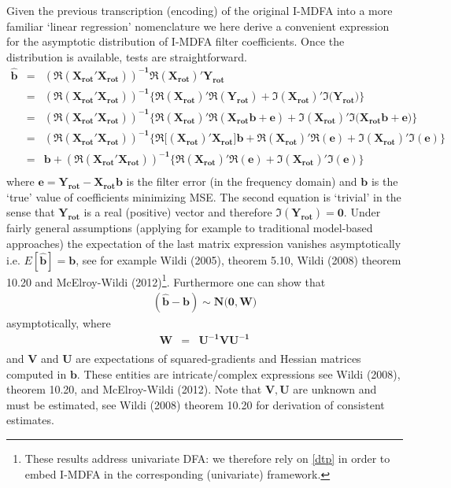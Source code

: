 \documentclass[11pt]{article}
\begin{document}
Given the previous transcription (encoding) of the original I-MDFA into a more familiar `linear regression' nomenclature we here derive a convenient expression for the asymptotic distribution of I-MDFA filter coefficients. Once the distribution is available, tests are straightforward.
\begin{eqnarray*}
\mathbf{\hat{b}}&=&\mathbf{\left(\Re\left(X_{\textrm{rot}}'X_{\textrm{rot}}\right)\right)^{-1}\Re(X_{\textrm{rot}})'Y_{\textrm{rot}}}\\
&=&\mathbf{\left(\Re\left(X_{\textrm{rot}}'X_{\textrm{rot}}\right)\right)^{-1}\Big\{\Re(X_{\textrm{rot}})'\Re(Y_{\textrm{rot}})+\Im(X_{\textrm{rot}})'\Im(Y_{\textrm{rot}}})\Big\}\\
&=&\mathbf{\left(\Re\left(X_{\textrm{rot}}'X_{\textrm{rot}}\right)\right)^{-1}\Big\{\Re(X_{\textrm{rot}})'\Re(X_{\textrm{rot}}b+e)+\Im(X_{\textrm{rot}})'\Im(X_{\textrm{rot}}b+e})\Big\}\\
&=&\mathbf{\left(\Re\left(X_{\textrm{rot}}'X_{\textrm{rot}}\right)\right)^{-1}\Big\{\Re\Big[(X_{\textrm{rot}})'X_{\textrm{rot}}\Big]b+\Re(X_{\textrm{rot}})'\Re(e)+\Im(X_{\textrm{rot}})'\Im(e)}\Big\}\\
&=&\mathbf{b+\left(\Re\left(X_{\textrm{rot}}'X_{\textrm{rot}}\right)\right)^{-1}\Big\{\Re(X_{\textrm{rot}})'\Re(e)+\Im(X_{\textrm{rot}})'\Im(e)}\Big\}\\
\end{eqnarray*}
where $\mathbf{e}=\mathbf{Y_{\textrm{rot}}-X_{\textrm{rot}}b}$ is the filter error (in the frequency domain) and $\mathbf{b}$ is the `true' value of coefficients minimizing MSE. The second equation is `trivial' in the sense that $\mathbf{Y_{\textrm{rot}}}$ is a real (positive) vector and therefore $\mathbf{\Im(Y_{\textrm{rot}})=0}$.
Under fairly general assumptions (applying for example to traditional model-based approaches) the expectation of the last matrix expression vanishes asymptotically i.e. $E[\mathbf{\hat{b}}]=\mathbf{b}$, see for example Wildi (2005), theorem 5.10, Wildi (2008) theorem 10.20 and McElroy-Wildi (2012)\footnote{These 
results address univariate DFA: we therefore rely on \ref{dtp} in order to embed I-MDFA in the corresponding (univariate) framework.}. Furthermore one can show that 
\begin{eqnarray}\label{distria}
\mathbf{(\hat{b}-b)}\sim\mathbf{N(0,{W}})
\end{eqnarray}
asymptotically, where
\begin{eqnarray*}
\mathbf{W}&=&\mathbf{U^{-1}VU^{-1}}\\
\end{eqnarray*}
and $\mathbf{V}$ and $\mathbf{U}$ are expectations of squared-gradients and Hessian matrices computed in $\mathbf{b}$. These entities are intricate/complex expressions see Wildi (2008), theorem 10.20, and McElroy-Wildi (2012). Note that $\mathbf{V,U}$ are unknown and must be estimated, see Wildi (2008) theorem 10.20 for derivation of  consistent estimates.   
\end{document}

